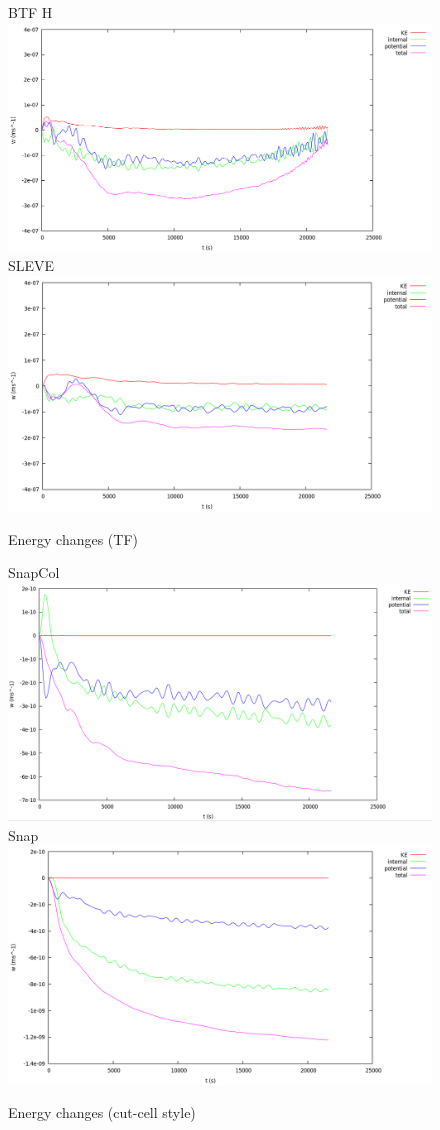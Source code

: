 \begin{figure}
BTF H
\includegraphics[width=\textwidth]{interim-results/restingBtfHEnergy.png}
SLEVE
\includegraphics[width=\textwidth]{interim-results/restingSleveEnergy.png}
\caption{Energy changes (TF)}
\label{fig:rest:energy-tf}
\end{figure}

\begin{figure}
SnapCol
\includegraphics[width=\textwidth]{interim-results/restingSnapColEnergy.png}
Snap
\includegraphics[width=\textwidth]{interim-results/restingSnapEnergy.png}
\caption{Energy changes (cut-cell style)}
\label{fig:rest:energy-cut-cell}
\end{figure}
